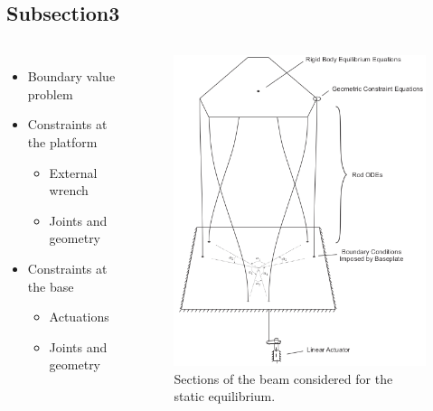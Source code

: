 \documentclass[compress]{thesisbeamer}
\begin{document}
        \subsection{Subsection3}
        \begin{frame}
			\begin{columns}
			\begin{itemize}%
  				\item Boundary value problem
  				\item Constraints at the platform
  				\begin{itemize}%
   					\item External wrench
   					\item Joints and geometry
  				\end{itemize}
  				\item Constraints at the base 
  				\begin{itemize}%
   					\item Actuations
   					\item Joints and geometry 
  				\end{itemize}
 			\end{itemize}
			\vspace{2cm}
			\begin{figure}[h]
				\centering
				\includegraphics[width=\textwidth]{images/BVP}
				\caption{Sections of the beam considered for the static equilibrium.}
			\end{figure}
			\end{columns}
		\end{frame}
		
\end{document}
